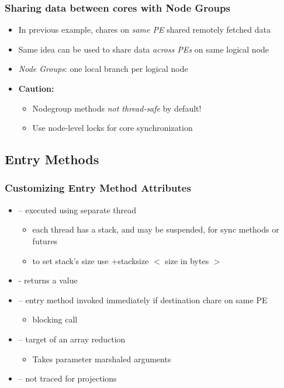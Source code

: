\begin{frame}[fragile]
  \frametitle{Sharing data between cores with Node Groups}
  \begin{itemize}
    \item In previous example, chares on {\em same PE} shared remotely fetched data
    \item Same idea can be used to share data {\em across PEs} on same logical node
    \item {\em Node Groups}: one local branch per logical node
    \item {\bf Caution:}
    \begin{itemize}
      \item Nodegroup methods {\em not thread-safe} by default! 
      \item Use node-level locks for core synchronization
    \end{itemize}
  \end{itemize}
\end{frame}

\subsection[Entry Methods]{Entry Methods}
\begin{frame}[fragile]
  \frametitle{Customizing Entry Method Attributes}
  \begin{itemize}
    \item {} – executed using separate thread
    \begin{itemize}
      \item each thread has a stack, and may be suspended, for sync methods or futures
      \item to set stack’s size use +stacksize $<$ size in bytes $>$
    \end{itemize}
    \item {} - returns a value
    \item {} – entry method invoked immediately if destination chare on same PE
    \begin{itemize}
      \item blocking call
    \end{itemize}
    \item {} – target of an array reduction
    \begin{itemize}
      \item Takes parameter marshaled arguments
    \end{itemize}
    \item {} – not traced for projections
  \end{itemize}
\end{frame}

